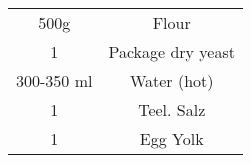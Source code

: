 \begin{tabular}{c | c}
  500g & Flour \\
  1 &  Package dry yeast \\
  300-350 ml & Water (hot) \\
  1 & Teel. Salz \\
  1 & Egg Yolk \\
\end{tabular}